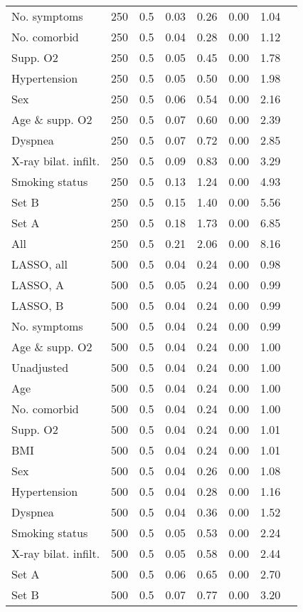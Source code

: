 \documentclass{article}
\begin{document}
{\begin{longtable}{lccccccc}
No. symptoms & 250 & 0.5 & 0.03 & 0.26 & 0.00 & 1.04\\
No. comorbid & 250 & 0.5 & 0.04 & 0.28 & 0.00 & 1.12\\
Supp. O2 & 250 & 0.5 & 0.05 & 0.45 & 0.00 & 1.78\\
Hypertension & 250 & 0.5 & 0.05 & 0.50 & 0.00 & 1.98\\
Sex & 250 & 0.5 & 0.06 & 0.54 & 0.00 & 2.16\\
Age \& supp. O2 & 250 & 0.5 & 0.07 & 0.60 & 0.00 & 2.39\\
Dyspnea & 250 & 0.5 & 0.07 & 0.72 & 0.00 & 2.85\\
X-ray bilat. infilt. & 250 & 0.5 & 0.09 & 0.83 & 0.00 & 3.29\\
Smoking status & 250 & 0.5 & 0.13 & 1.24 & 0.00 & 4.93\\
Set B & 250 & 0.5 & 0.15 & 1.40 & 0.00 & 5.56\\
Set A & 250 & 0.5 & 0.18 & 1.73 & 0.00 & 6.85\\
All & 250 & 0.5 & 0.21 & 2.06 & 0.00 & 8.16\\ \midrule
LASSO, all & 500 & 0.5 & 0.04 & 0.24 & 0.00 & 0.98\\
LASSO, A & 500 & 0.5 & 0.05 & 0.24 & 0.00 & 0.99\\
LASSO, B & 500 & 0.5 & 0.04 & 0.24 & 0.00 & 0.99\\
No. symptoms & 500 & 0.5 & 0.04 & 0.24 & 0.00 & 0.99\\
Age \& supp. O2 & 500 & 0.5 & 0.04 & 0.24 & 0.00 & 1.00\\
Unadjusted & 500 & 0.5 & 0.04 & 0.24 & 0.00 & 1.00\\
Age & 500 & 0.5 & 0.04 & 0.24 & 0.00 & 1.00\\
No. comorbid & 500 & 0.5 & 0.04 & 0.24 & 0.00 & 1.00\\
Supp. O2 & 500 & 0.5 & 0.04 & 0.24 & 0.00 & 1.01\\
BMI & 500 & 0.5 & 0.04 & 0.24 & 0.00 & 1.01\\
Sex & 500 & 0.5 & 0.04 & 0.26 & 0.00 & 1.08\\
Hypertension & 500 & 0.5 & 0.04 & 0.28 & 0.00 & 1.16\\
Dyspnea & 500 & 0.5 & 0.04 & 0.36 & 0.00 & 1.52\\
Smoking status & 500 & 0.5 & 0.05 & 0.53 & 0.00 & 2.24\\
X-ray bilat. infilt. & 500 & 0.5 & 0.05 & 0.58 & 0.00 & 2.44\\
Set A & 500 & 0.5 & 0.06 & 0.65 & 0.00 & 2.70\\
Set B & 500 & 0.5 & 0.07 & 0.77 & 0.00 & 3.20\\

\end{longtable}}
\end{document}
